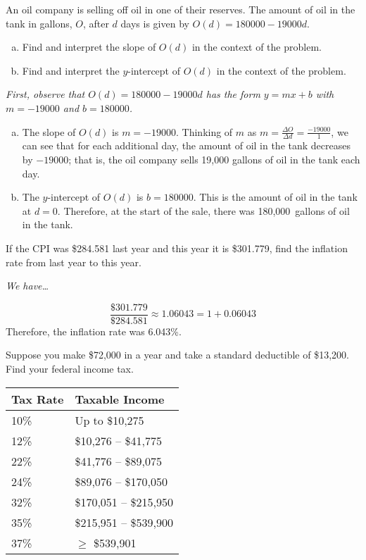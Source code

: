 \documentclass[12pt,letterpaper]{exam}
\begin{document}
\begin{questions}
\newpage
\question[10] An oil company is selling off oil in one of their reserves. The amount of oil in the tank in gallons, $O$, after $d$ days is given by $O(d)= 180000 - 19000d$.
	\begin{enumerate}[(a)]
	\item Find and interpret the slope of $O(d)$ in the context of the problem. 
	\item Find and interpret the $y$-intercept of $O(d)$ in the context of the problem. 
	\end{enumerate} \pspace

{\itshape First, observe that $O(d)= 180000 - 19000d$ has the form $y= mx + b$ with $m= -19000$ and $b= 180000$. 
\begin{enumerate}[(a)]
\item The slope of $O(d)$ is $m= -19000$. Thinking of $m$ as $m= \frac{\Delta O}{\Delta d}= \frac{-19000}{1}$, we can see that for each additional day, the amount of oil in the tank decreases by $-19000$; that is, the oil company sells 19,000 gallons of oil in the tank each day. \pspace

\item The $y$-intercept of $O(d)$ is $b= 180000$. This is the amount of oil in the tank at $d= 0$. Therefore, at the start of the sale, there was 180,000~gallons of oil in the tank. 
\end{enumerate}
}



\newpage
\question[10] If the CPI was \$284.581 last year and this year it is \$301.779, find the inflation rate from last year to this year. \pspace

{\itshape
We have\dots \par\vspace{0.1cm}
	\[
	\dfrac{\$301.779}{\$284.581} \approx 1.06043= 1 + 0.06043
	\] \pspace
Therefore, the inflation rate was 6.043\%. 
}



\newpage
\question[10] Suppose you make \$72,000 in a year and take a standard deductible of \$13,200. Find your federal income tax. \par
	\begin{table}[!ht]
	\centering
	\begin{tabular}{|l|l|} \hline
	Tax Rate & Taxable Income \\ \hline \hline
	10\% & Up to \$10,275 \\ \hline
	12\% & \$10,276 -- \$41,775 \\ \hline
	22\% & \$41,776 -- \$89,075 \\ \hline
	24\% & \$89,076 -- \$170,050 \\ \hline
	32\% & \$170,051 -- \$215,950 \\ \hline
	35\% & \$215,951 -- \$539,900 \\ \hline
	37\% & $\geq$ \$539,901 \\ \hline
	\end{tabular}
	\end{table} \pspace


\end{questions}
\end{document}
